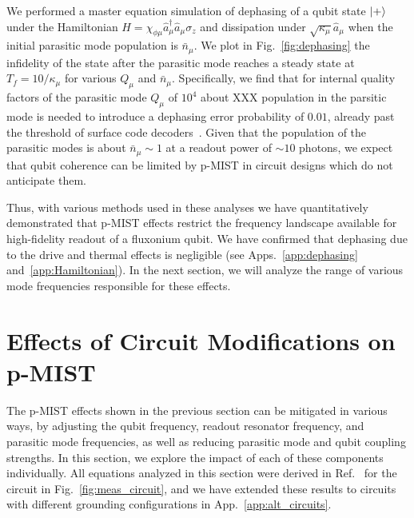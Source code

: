 \documentclass[prx,showpacs,notitlepage,twocolumn,superscriptaddress,nofootinbib,preprintnumbers,floatfix]{revtex4-2}
\begin{document}
We performed a master equation simulation of dephasing of a qubit state $\ket{+}$ under the Hamiltonian $H=\chi_{\phi\mu} \hat a_\mu^\dagger \hat a_\mu \sigma_z$ and dissipation under $\sqrt{\kappa_\mu}\hat a_\mu$ when the initial parasitic mode population is $\bar n_\mu$. We plot in Fig.~\ref{fig:dephasing} the infidelity of the state after the parasitic mode reaches a steady state at $T_f=10/\kappa_\mu$ for various $Q_\mu$ and $\bar n_\mu$. Specifically, we find that for internal quality factors of the parasitic mode $Q_\mu$ of $10^{4}$ about XXX population in the parsitic mode is needed to introduce a dephasing error probability of $0.01$, already past the threshold of surface code decoders~\cite{fowler2012surface}. Given that the population of the parasitic modes is about $\bar n_\mu\sim 1$ at a readout power of $\sim 10$ photons, we expect that qubit coherence can be limited by p-MIST in circuit designs which do not anticipate them. 


Thus, with various methods used in these analyses we have quantitatively demonstrated that p-MIST effects restrict the frequency landscape available for high-fidelity readout of a fluxonium qubit. We have confirmed that dephasing due to the drive and thermal effects is negligible (see Apps.~\ref{app:dephasing} and~\ref{app:Hamiltonian}). In the next section, we will analyze the range of various mode frequencies responsible for these effects.

\section{Effects of Circuit Modifications on p-MIST}\label{sec:expressions}
The p-MIST effects shown in the previous section can be mitigated in various ways, by adjusting the qubit frequency, readout resonator frequency, and parasitic mode frequencies, as well as reducing parasitic mode and qubit coupling strengths. In this section, we explore the impact of each of these components individually. All equations analyzed in this section were derived in Ref.~\cite{viola2015collective} for the circuit in Fig.~\ref{fig:meas_circuit}, and we have extended these results to circuits with different grounding configurations in App.~\ref{app:alt_circuits}.
\end{document}
